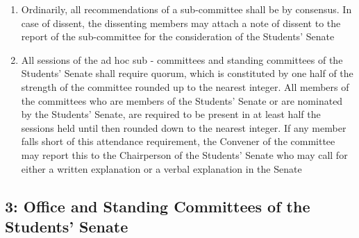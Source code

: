 \begin{enumerate}
  \begin{enumerate}
  \def\labelenumii{\alph{enumii}.}
  \item
    Ordinarily, all recommendations of a sub-committee shall be by
    consensus. In case of dissent, the dissenting members may attach a
    note of dissent to the report of the sub-committee for the
    consideration of the Students' Senate
  \item
    All sessions of the ad hoc sub - committees and standing committees
    of the Students' Senate shall require quorum, which is constituted
    by one half of the strength of the committee rounded up to the
    nearest integer. All members of the committees who are members of
    the Students' Senate or are nominated by the Students' Senate, are
    required to be present in at least half the sessions held until then
    rounded down to the nearest integer. If any member falls short of
    this attendance requirement, the Convener of the committee may
    report this to the Chairperson of the Students' Senate who may call
    for either a written explanation or a verbal explanation in the
    Senate
  \end{enumerate}
\end{enumerate}

\subsection{3: Office and Standing Committees of the Students'
Senate}\label{office-and-standing-committees-of-the-students-senate}

